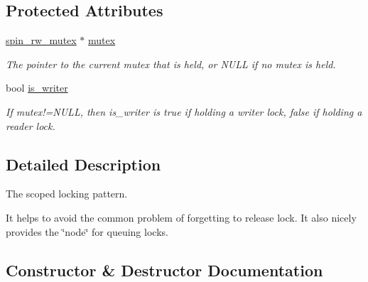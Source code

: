 \subsection*{Protected Attributes}
\begin{DoxyCompactItemize}
\item 
\hypertarget{classtbb_1_1spin__rw__mutex__v3_1_1scoped__lock_a8d70c5a2348e30a6979bfbf677328dc4}{}\hyperlink{classtbb_1_1spin__rw__mutex}{spin\+\_\+rw\+\_\+mutex} $\ast$ \hyperlink{classtbb_1_1spin__rw__mutex__v3_1_1scoped__lock_a8d70c5a2348e30a6979bfbf677328dc4}{mutex}\label{classtbb_1_1spin__rw__mutex__v3_1_1scoped__lock_a8d70c5a2348e30a6979bfbf677328dc4}

\begin{DoxyCompactList}\small\item\em The pointer to the current mutex that is held, or N\+U\+L\+L if no mutex is held. \end{DoxyCompactList}\item 
bool \hyperlink{classtbb_1_1spin__rw__mutex__v3_1_1scoped__lock_acfd129dc5106ad1129ba803e67311050}{is\+\_\+writer}
\begin{DoxyCompactList}\small\item\em If mutex!=N\+U\+L\+L, then is\+\_\+writer is true if holding a writer lock, false if holding a reader lock. \end{DoxyCompactList}\end{DoxyCompactItemize}


\subsection{Detailed Description}
The scoped locking pattern. 

It helps to avoid the common problem of forgetting to release lock. It also nicely provides the \char`\"{}node\char`\"{} for queuing locks. 

\subsection{Constructor \& Destructor Documentation}
\hypertarget{classtbb_1_1spin__rw__mutex__v3_1_1scoped__lock_a285b355121772c874a7ecaaf4d347224}{}
